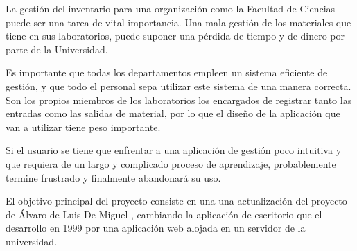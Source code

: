 
La gestión del inventario para una organización como la Facultad de Ciencias puede ser una tarea de vital importancia. Una mala gestión de los materiales que tiene en sus laboratorios, puede suponer una pérdida de tiempo y de dinero por parte de la Universidad.

Es importante que todas los departamentos empleen un sistema eficiente de gestión, y que todo el personal sepa utilizar este sistema de una manera correcta. Son los propios miembros de los laboratorios los encargados de registrar tanto las entradas como las salidas de material, por lo que el diseño de la aplicación que van a utilizar tiene peso importante. 

Si el usuario se tiene que enfrentar a una aplicación de gestión poco intuitiva y que requiera de un largo y complicado proceso de aprendizaje, probablemente termine frustrado y finalmente abandonará su uso.


El objetivo principal del proyecto consiste en una una actualización del proyecto de Álvaro de Luis De Miguel \cite{proyecto:Geslab-1.0}, cambiando la aplicación de escritorio que el desarrollo en 1999 por una aplicación web alojada en un servidor de la universidad.